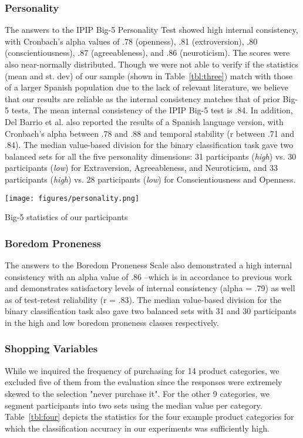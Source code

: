\subsubsection{Personality}
The answers to the IPIP Big-5 Personality Test showed high internal consistency, with Cronbach's alpha values of .78 (openness), .81 (extroversion), .80 (conscientiousness), .87 (agreeableness), and .86 (neuroticism). The scores were also near-normally distributed. Though we were not able to verify if the statistics (mean and st. dev) of our sample (shown in Table~\ref{tbl:three}) match with those of a larger Spanish population due to the lack of relevant literature, we believe that our results are reliable as the internal consistency matches that of prior Big-5 tests. The mean internal consistency of the IPIP Big-5 test \cite{goldberg2006international} is .84. In addition, Del Barrio et al. \cite{del2003personalidad} also reported the results of a Spanish language version, with Cronbach's alpha between .78 and .88 and temporal stability (r between .71 and .84). 
The median value-based division for the binary classification task gave two balanced sets for all the five personality dimensions: 31 participants (\textit{high}) vs. 30 participants (\textit{low}) for Extraversion, Agreeableness, and Neuroticism, and 33 participants (\textit{high}) vs. 28 participants (\textit{low}) for Conscientiousness and Openness.  

\begin{table}
  \texttt{[image: figures/personality.png]}
  \caption{Big-5 statistics of our participants}
  \label{tbl:three}
\end{table}

\subsubsection{Boredom Proneness}
The answers to the Boredom Proneness Scale also demonstrated a high internal consistency with an alpha value of .86 --which is in accordance to previous work \cite{farmer1986boredom} and demonstrates satisfactory levels of internal consistency (alpha = .79) as well as of test-retest reliability (r = .83). The median value-based division for the binary classification task also gave two balanced sets with 31 and 30 participants in the high and low boredom proneness classes respectively. 

\subsubsection{	Shopping Variables}
While we inquired the frequency of purchasing for 14 product categories, we excluded five of them from the evaluation since the responses were extremely skewed to the selection "never purchase it". For the other 9 categories, we segment participants into two sets using the median value per category. Table~\ref{tbl:four} depicts the statistics for the four example product categories for which the classification accuracy in our experiments was sufficiently high.


